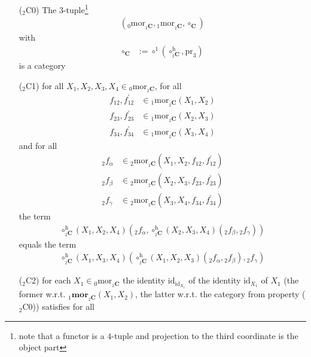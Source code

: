 \begin{enumerate}
\item[(${}_{2}$C0)]
The $3$-tuple\footnote{note that a functor is a $4$-tuple and projection to the third coordinate is the object part}
\begin{align*}
  \left(
    {}_{0}\mathrm{mor}_{{}_{2}\mathbf{C}},
    {}_{1}\mathrm{mor}_{{}_{2}\mathbf{C}},
    \circ_{\mathbf{C}}
  \right)
\end{align*}
with
\begin{align*}
  \circ_{\mathbf{C}}
  &:=
  \circ^{1}
  \left(
    \circ_{{}_{2}\mathbf{C}}^{\textrm{h}},
    \mathrm{pr}_{3}
  \right)
\end{align*}
is a category
\item[(${}_{2}$C1)]
for all $X_{1},X_{2},X_{3},X_{4} \in {}_{0}\mathrm{mor}_{{}_{2}\mathbf{C}}$, for all
\begin{align*}
  f_{12},f_{12}^{\backprime}
  &\in
  {}_{1}\mathrm{mor}_{{}_{2}\mathbf{C}}(X_{1},X_{2})
  \\
  f_{23},f_{23}^{\backprime}
  &\in
  {}_{1}\mathrm{mor}_{{}_{2}\mathbf{C}}(X_{2},X_{3})
  \\
  f_{34},f_{34}^{\backprime}
  &\in
  {}_{1}\mathrm{mor}_{{}_{2}\mathbf{C}}(X_{3},X_{4})
\end{align*}
and for all
\begin{align*}
  {}_{2}f_{\alpha}
  &\in
  {}_{2}\mathrm{mor}_{{}_{2}\mathbf{C}}(X_{1},X_{2},f_{12},f_{12}^{\backprime})
  \\
  {}_{2}f_{\beta}
  &\in
  {}_{2}\mathrm{mor}_{{}_{2}\mathbf{C}}(X_{2},X_{3},f_{23},f_{23}^{\backprime})
  \\
  {}_{2}f_{\gamma}
  &\in
  {}_{2}\mathrm{mor}_{{}_{2}\mathbf{C}}(X_{3},X_{4},f_{34},f_{34}^{\backprime})
\end{align*}
the term
\begin{align*}
  \circ_{{}_{2}\mathbf{C}}^{\textrm{h}}
  (X_{1},X_{2},X_{4})
  \left(
    {}_{2}f_{\alpha},
    \circ_{{}_{2}\mathbf{C}}^{\textrm{h}}
    (X_{2},X_{3},X_{4})
    ({}_{2}f_{\beta},{}_{2}f_{\gamma})
  \right)
\end{align*}
equals the term
\begin{align*}
  \circ_{{}_{2}\mathbf{C}}^{\textrm{h}}
  (X_{1},X_{3},X_{4})
  \left(
    \circ_{{}_{2}\mathbf{C}}^{\textrm{h}}
    (X_{1},X_{2},X_{3})
    ({}_{2}f_{\alpha},{}_{2}f_{\beta}),
    {}_{2}f_{\gamma}
  \right)
\end{align*}
\item[(${}_{2}$C2)]
for each $X_{1} \in {}_{0}\mathrm{mor}_{{}_{2}\mathbf{C}}$ the identity $\mathrm{id}_{\mathrm{id}_{X_{1}}}$ of the identity $\mathrm{id}_{X_{1}}$ of $X_{1}$ (the former w.r.t. ${}_{1}\mathbf{mor}_{{}_{2}\mathbf{C}}(X_{1},X_{2})$, the latter w.r.t. the category from property (${}_{2}$C0)) satisfies for all

\end{enumerate}
